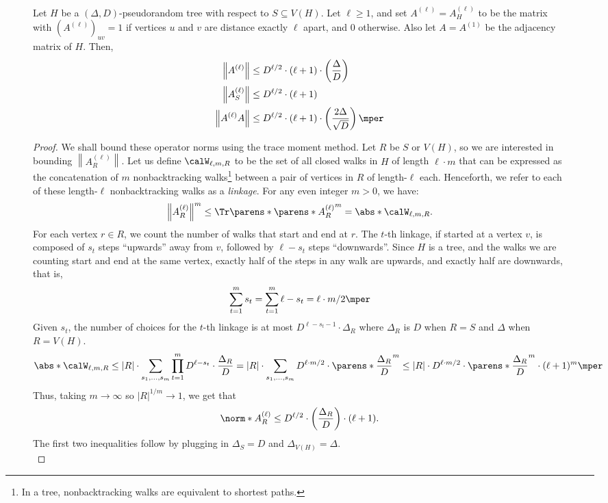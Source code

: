 \documentclass[11pt,letterpaper]{article}
\begin{document}
\begin{figure}
    \begin{lemma}
        \label{lem:trace-method-best-method}
        Let $H$ be a $(\Delta,D)$-pseudorandom tree with respect to $S \subseteq V(H)$. Let $\ell \ge 1$, and set $A^{(\ell)} = A^{(\ell)}_H$ to be the matrix with $(A^{(\ell)})_{uv} = 1$ if vertices $u$ and $v$ are distance exactly $\ell$ apart, and $0$ otherwise. Also let $A = A^{(1)}$ be the adjacency matrix of $H$. Then,
        \begin{align*}
            \left\| A^{(\ell)} \right\| &\le D^{\ell/2} \cdot (\ell+1) \cdot \left( \frac{\Delta}{D} \right) \\
            \left\| A^{(\ell)}_S \right\| &\le D^{\ell/2} \cdot (\ell+1) \\
            \left\| A^{(\ell)} A \right\| &\le D^{\ell/2} \cdot (\ell+1) \cdot \left( \frac{2\Delta}{\sqrt{D}} \right) \mper
        \end{align*}
    \end{lemma}
    \begin{proof}
        We shall bound these operator norms using the trace moment method. Let $R$ be $S$ or $V(H)$, so we are interested in bounding $\left\|A^{(\ell)}_R\right\|$. Let us define $\calW_{\ell,m,R}$ to be the set of all closed walks in $H$ of length $\ell\cdot m$ that can be expressed as the concatenation of $m$ nonbacktracking walks\footnote{In a tree, nonbacktracking walks are equivalent to shortest paths.} between a pair of vertices in $R$ of length-$\ell$ each.
        Henceforth, we refer to each of these length-$\ell$ nonbacktracking walks as a \emph{linkage}.
        For any even integer $m > 0$, we have:
        \[ \left\| A^{(\ell)}_R \right\|^m \le \Tr\parens*{ \parens*{A^{(\ell)}_R}^m } = \abs*{\calW_{\ell,m,R}}. \]
        For each vertex $r\in R$, we count the number of walks that start and end at $r$.
        The $t$-th linkage, if started at a vertex $v$, is composed of $s_t$ steps ``upwards'' away from $v$, followed by $\ell-s_t$ steps ``downwards''.
        Since $H$ is a tree, and the walks we are counting start and end at the same vertex, exactly half of the steps in any walk are upwards, and exactly half are downwards, that is,
        $$
            \sum_{t=1}^m s_t = \sum_{t=1}^m \ell-s_t = \ell\cdot m / 2\mper
        $$
        Given $s_t$, the number of choices for the $t$-th linkage is at most $D^{\ell-s_t-1} \cdot \Delta_R$ where $\Delta_R$ is $D$ when $R = S$ and $\Delta$ when $R = V(H)$.
        \[
            \abs*{\calW_{\ell,m,R}} \le |R| \cdot \sum_{s_1,\dots,s_{m}}  \prod_{t=1}^m D^{\ell-s_t}\cdot\frac{\Delta_R}{D} = |R| \cdot \sum_{s_1,\dots,s_m} D^{\ell\cdot m / 2} \cdot \parens*{\frac{\Delta_R}{D}}^m \le |R| \cdot D^{\ell\cdot m / 2} \cdot \parens*{\frac{\Delta_R}{D}}^m \cdot (\ell+1)^m \mper
        \]
        Thus, taking $m \to \infty$ so $|R|^{1/m} \to 1$, we get that
        \[ \norm*{ A^{(\ell)}_R } \le D^{\ell/2} \cdot \left( \frac{\Delta_R}{D} \right) \cdot (\ell+1). \]
        The first two inequalities follow by plugging in $\Delta_S = D$ and $\Delta_{V(H)} = \Delta$.\\


\end{proof}
\end{figure}
\end{document}
